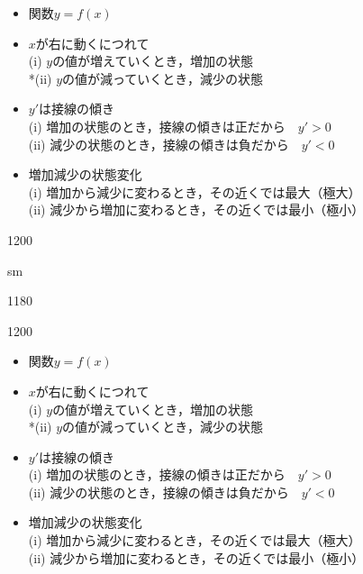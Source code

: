 \documentclass[landscape,10pt]{jarticle}
\newcommand{\slidepage}[1][s]{%
\setcounter{ketpicctra}{18}%
\if#1m \setcounter{ketpicctra}{1}\fi
\hypersetup{linkcolor=black}%

\begin{layer}{118}{0}
\putnotee{122}{-\theketpicctra.05}{\small\thepage/\pageref{pageend}}
\end{layer}\hypersetup{linkcolor=___}

}
\begin{document}
\begin{itemize}
\item
関数$y=f(x)$
\item
$x$が右に動くにつれて\\
\hspace*{4zw}(i) $y$の値が増えていくとき，{\color{red}増加の状態}\\
\hspace*{4zw}*(ii) $y$の値が減っていくとき，{\color{red}減少の状態}
\item
$y'$は接線の傾き\\
\hspace*{4zw}(i) 増加の状態のとき，接線の傾きは正だから　$y'>0$\\
\hspace*{4zw}(ii) 減少の状態のとき，接線の傾きは負だから　$y'<0$\\
\item
増加減少の状態変化\\
\hspace*{4zw}(i) 増加から減少に変わるとき，その近くでは最大（{\color{red}極大}）\\
\hspace*{4zw}(ii) 減少から増加に変わるとき，その近くでは最小（{\color{red}極小}）
\end{itemize}

\sameslide

\vspace*{18mm}


\begin{layer}{120}{0}
\end{layer}

\slidepage

\begin{layer}{120}{0}
\end{layer}

\begin{itemize}
\item
関数$y=f(x)$
\item
$x$が右に動くにつれて\\
\hspace*{4zw}(i) $y$の値が増えていくとき，{\color{red}増加の状態}\\
\hspace*{4zw}*(ii) $y$の値が減っていくとき，{\color{red}減少の状態}
\item
$y'$は接線の傾き\\
\hspace*{4zw}(i) 増加の状態のとき，接線の傾きは正だから　$y'>0$\\
\hspace*{4zw}(ii) 減少の状態のとき，接線の傾きは負だから　$y'<0$\\
\item
増加減少の状態変化\\
\hspace*{4zw}(i) 増加から減少に変わるとき，その近くでは最大（{\color{red}極大}）\\
\hspace*{4zw}(ii) 減少から増加に変わるとき，その近くでは最小（{\color{red}極小}）
\end{itemize}
\label{pageend}\mbox{}
\end{document}
